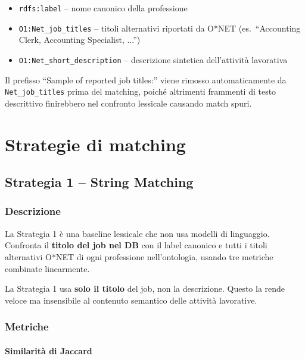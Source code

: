 \documentclass[12pt, a4paper]{report}
\begin{document}
\begin{itemize}
  \item \texttt{rdfs:label} -- nome canonico della professione
  \item \texttt{O1:Net\_job\_titles} -- titoli alternativi riportati
        da O*NET (es.\ ``Accounting Clerk, Accounting Specialist, ...'')
  \item \texttt{O1:Net\_short\_description} -- descrizione sintetica
        dell'attività lavorativa
\end{itemize}

Il prefisso ``Sample of reported job titles:'' viene rimosso
automaticamente da \texttt{Net\_job\_titles} prima del matching,
poiché altrimenti frammenti di testo descrittivo finirebbero nel
confronto lessicale causando match spuri.

% 
\chapter{Strategie di matching}
% 

\section{Strategia 1 -- String Matching}

\subsection{Descrizione}

La Strategia 1 è una baseline lessicale che non usa modelli di
linguaggio. Confronta il \textbf{titolo del job nel DB} con il label
canonico e tutti i titoli alternativi O*NET di ogni professione
nell'ontologia, usando tre metriche combinate linearmente.

\begin{notebox}
La Strategia 1 usa \textbf{solo il titolo} del job, non la
descrizione. Questo la rende veloce ma insensibile al contenuto
semantico delle attività lavorative.
\end{notebox}

\subsection{Metriche}

\subsubsection{Similarità di Jaccard}
\end{document}
